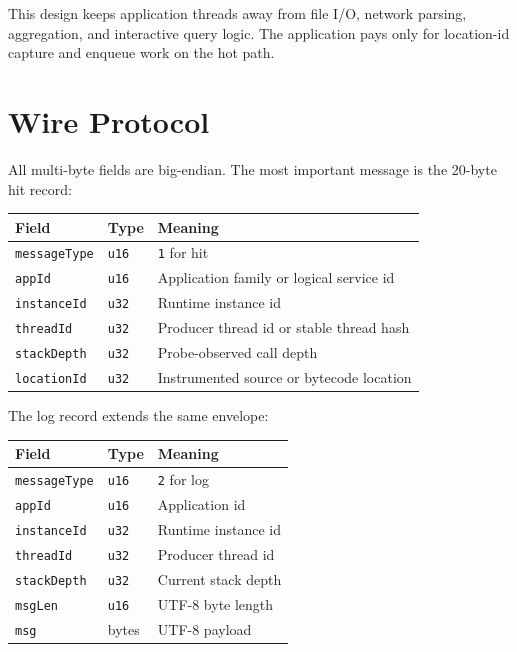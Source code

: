 \documentclass[11pt]{article}
\newcommand{\code}[1]{\texttt{#1}}
\begin{document}
This design keeps application threads away from file I/O, network parsing,
aggregation, and interactive query logic. The application pays only for
location-id capture and enqueue work on the hot path.

\section{Wire Protocol}

All multi-byte fields are big-endian. The most important message is the
20-byte hit record:

\begin{center}
\begin{tabular}{lll}
\textbf{Field} & \textbf{Type} & \textbf{Meaning} \\
\hline
\code{messageType} & \code{u16} & \code{1} for hit \\
\code{appId} & \code{u16} & Application family or logical service id \\
\code{instanceId} & \code{u32} & Runtime instance id \\
\code{threadId} & \code{u32} & Producer thread id or stable thread hash \\
\code{stackDepth} & \code{u32} & Probe-observed call depth \\
\code{locationId} & \code{u32} & Instrumented source or bytecode location \\
\end{tabular}
\end{center}

The log record extends the same envelope:

\begin{center}
\begin{tabular}{lll}
\textbf{Field} & \textbf{Type} & \textbf{Meaning} \\
\hline
\code{messageType} & \code{u16} & \code{2} for log \\
\code{appId} & \code{u16} & Application id \\
\code{instanceId} & \code{u32} & Runtime instance id \\
\code{threadId} & \code{u32} & Producer thread id \\
\code{stackDepth} & \code{u32} & Current stack depth \\
\code{msgLen} & \code{u16} & UTF-8 byte length \\
\code{msg} & bytes & UTF-8 payload \\
\end{tabular}
\end{center}
\end{document}
